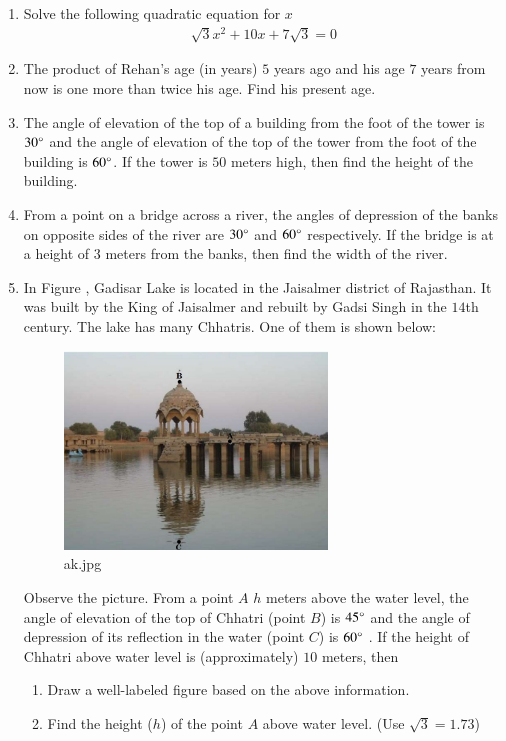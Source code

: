 \documentclass{article}
\theoremstyle{remark}
\begin{document}
\begin{enumerate}
    \item Solve the following quadratic equation for $x$ 
    \begin{align}
        \sqrt{3}x^2 + 10x + 7\sqrt{3} = 0
    \end{align}
    \item  The product of Rehan's age (in years) $5$ years ago and his age $7$ years from now is one more than twice his age. Find his present age.
    \item The angle of elevation of the top of a building from the foot of the tower is $30\degree$ and the angle of elevation of the top of the tower from the foot of the building is $60\degree$. If the tower is $50$ meters high, then find the height of the building.
    \item From a point on a bridge across a river, the angles of depression of the banks on opposite sides of the river are $30\degree$ and $60\degree$ respectively. If the bridge is at a height of $3$ meters from the banks, then find the width of the river. 
    \item In Figure , Gadisar Lake is located in the Jaisalmer district of Rajasthan. It was built by the King of Jaisalmer and rebuilt by Gadsi Singh in the $14$th century. The lake has many Chhatris. One of them is shown below:
    \begin{figure}[H]
        \centering
    	 \includegraphics[width=70mm]{figs/ak.jpeg}
        \caption{ak.jpg}
        \label{fig:ak}
    \end{figure}
    Observe the picture. From a point $A$ $h$ meters above the water level, the angle of elevation of the top of Chhatri (point $B$) is $45\degree$ and the angle of depression of its reflection in the water (point $C$) is $60\degree$ . If the height of Chhatri above water level is (approximately) $10$ meters, then 
    \begin{enumerate}
        \item Draw a well-labeled figure based on the above information.
        \item Find the height ($h$) of the point $A$ above water level. (Use $\sqrt{3}=1.73$) 
    \end{enumerate}


\end{enumerate}
\end{document}
